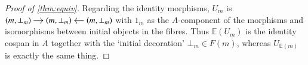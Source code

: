 \documentclass[reqno]{amsart}
\begin{document}
\begin{proof}[Proof of \cref{thm:equiv}]
Regarding the identity morphisms, $U_m$ is $\cspn{(m,\bot_m)}{(m,\bot_m)}{(m,\bot_m)}{}{}$ with $1_m$ as the $A$-component of the morphisms and isomorphisms between initial objects in the fibres. Thus $\mathbb{E}(U_m)$ is the identity cospan in $A$ together with the `initial decoration' $\bot_m\in F(m)$, whereas $U_{\mathbb{E}(m)}$ is exactly the same thing.

\begin{comment}
For any object $c$, the horizontal 1-cell $\hat{U}_{\mathbb{E}(c)}$ is given by $\hat{U}_c$ which is given by the pair:
\[
\begin{tikzpicture}[scale=1.5]
\node (A) at (0,0) {$c$};
\node (B) at (1,0) {$c$};
\node (C) at (2,0) {$c$};
\node (D) at (3,0) {$!_c \in F(c)$};
\path[->,font=\scriptsize,>=angle 90]
(A) edge node[above]{$1$} (B)
(C) edge node[above]{$1$} (B);
\end{tikzpicture}
\]
The horizontal 1-cell $U_c$ is given by
\[
\begin{tikzpicture}[scale=1.5]
\node (A) at (0,0) {$L(c)$};
\node (B) at (1,0) {$L(c)$};
\node (C) at (2,0) {$L(c)$};
\path[->,font=\scriptsize,>=angle 90]
(A) edge node[above]{$1$} (B)
(C) edge node[above]{$1$} (B);
\end{tikzpicture}
\]
and so $\mathbb{E}(U_c)$ is given by the pair:
\[
\begin{tikzpicture}[scale=1.5]
\node (A) at (0,0) {$c$};
\node (B) at (1,0) {$R(L(c))$};
\node (C) at (2,0) {$c$};
\node (D) at (3.25,0) {$!_c \in F(R(L(c)))$};
\path[->,font=\scriptsize,>=angle 90]
(A) edge node[above]{$\eta_c$} (B)
(C) edge node[above]{$\eta_c$} (B);
\end{tikzpicture}
\]
Then we can obtain the natural isomorphism $\mathbb{E}_c \maps \hat{U}_{\mathbb{E}(c)} \xrightarrow{\sim} \mathbb{E}(U_c)$ as the 2-morphism
\[
\begin{tikzpicture}[scale=1.5]
\node (A) at (0,0) {$c$};
\node (B) at (1,0) {$c$};
\node (C) at (2,0) {$c$};
\node (A') at (0,-1) {$c$};
\node (B') at (1,-1) {$R(L(c))$};
\node (C') at (2,-1) {$c$};
\node (D) at (3,0) {$!_c \in F(c)$};
\node (D') at (3.25,-1) {$!_{R(L(c))} \in F(R(L(c)))$};
\path[->,font=\scriptsize,>=angle 90]
(A) edge node[above]{$1$} (B)
(C) edge node[above]{$1$} (B)
(A') edge node[above]{$\eta_c$} (B')
(C') edge node[above]{$\eta_c$} (B')
(A) edge node [left]{$1$} (A')
(B) edge node [left]{$\eta_c$} (B')
(C) edge node [left]{$1$} (C');
\end{tikzpicture}
\]
$$\tau \maps F(\eta_c)(!_c) \xrightarrow{!} !_{R(L(c))}$$
of $F\lCsp$.


\end{comment}
\end{proof}
\end{document}
